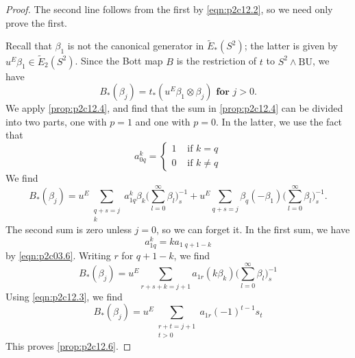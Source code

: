 \documentclass[../main]{subfiles}
\begin{document}
\begin{proof}
The second line follows from the first by \eqref{eqn:p2c12.2}, so we need only prove the first. 

Recall that $\beta_1$ is not the canonical generator in $\widetilde{E}_\ast(S^2)$; the latter is given by $u^E\beta_1\in\widetilde{E}_2(S^2)$. Since the Bott map $B$ is the restriction of $t$ to $S^2\wedge\mathrm{BU}$, we have \[B_\ast(\beta_j) = t_\ast(u^E\beta_1\otimes\beta_j)\textbf{ for } j>0.\] 
We apply \eqref{prop:p2c12.4}, and find that the sum in \eqref{prop:p2c12.4} can be divided into two parts, one with $p=1$ and one with $p=0$. In the latter, we use the fact that 
\[a^k_{0q} = \begin{cases}1 &\text{ if }k=q\\ 0&\text{ if } k\neq q\end{cases}\]
We find
\begin{equation*}
B_\ast(\beta_j) = u^E \sum_{\substack{q+s=j\\ k}} a^k_{1q} \beta_k \bigg(\sum^\infty_{l=0}\beta_l\bigg)^{-1}_s + u^E \sum_{q+s=j} \beta_{q}(-\beta_1)\bigg(\sum^\infty_{l=0} \beta_l\bigg)^{-1}_s.
\end{equation*}
The second sum is zero unless $j=0$, so we can forget it. In the first sum, we have 
\[a^k_{1q} = ka_{1\; q+1-k}\]
by \eqref{eqn:p2c03.6}. Writing $r$ for $q+1-k$, we find
\[B_\ast(\beta_j) = u^E \sum_{r+s+k=j+1} a_{1r} (k\beta_k)\bigg(\sum^\infty_{l=0} \beta_l\bigg)^{-1}_s\]
Using \eqref{eqn:p2c12.3}, we find
\[B_\ast(\beta_j) = u^E \sum_{\substack{r+t=j+1\\t>0}} a_{1r} (-1)^{t-1} s_t\]
This proves \eqref{prop:p2c12.6}.
\end{proof}
\end{document}
